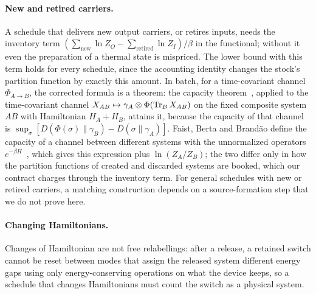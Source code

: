 \paragraph{New and retired carriers.} A schedule that delivers new output carriers, or retires inputs, needs the inventory term $(\sum_{\mathrm{new}}\ln Z_O-\sum_{\mathrm{retired}}\ln Z_I)/\beta$ in the functional; without it even the preparation of a thermal state is mispriced. The lower bound with this term holds for every schedule, since the accounting identity changes the stock's partition function by exactly this amount. In batch, for a time-covariant channel $\Phi_{A\to B}$, the corrected formula is a theorem: the capacity theorem~\cite[Thm.~7.1]{FBB21}, applied to the time-covariant channel $X_{AB}\mapsto\gamma_A\otimes\Phi(\operatorname{Tr}_BX_{AB})$ on the fixed composite system $AB$ with Hamiltonian $H_A+H_B$, attains it, because the capacity of that channel is $\sup_\sigma[D(\Phi(\sigma)\|\gamma_B)-D(\sigma\|\gamma_A)]$. Faist, Berta and Brand\~ao define the capacity of a channel between different systems with the unnormalized operators $e^{-\beta H}$~\cite[Eq.~(4.2)]{FBB21}, which gives this expression plus $\ln(Z_A/Z_B)$; the two differ only in how the partition functions of created and discarded systems are booked, which our contract charges through the inventory term. For general schedules with new or retired carriers, a matching construction depends on a source-formation step that we do not prove here.

\paragraph{Changing Hamiltonians.} Changes of Hamiltonian are not free relabellings: after a release, a retained switch cannot be reset between modes that assign the released system different energy gaps using only energy-conserving operations on what the device keeps, so a schedule that changes Hamiltonians must count the switch as a physical system.

